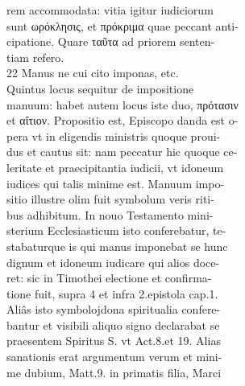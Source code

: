 \documentclass{article}
\begin{document}
\begin{pages}
                rem accommodata: vitia igitur iudiciorum \\
                sunt ωρόκλησις, et πρόκριμα quae peccant anti- \\
                cipatione. Quare ταῦτα ad priorem senten- \\
                tiam refero. \\
                22 Manus ne cui cito imponas, etc. \\
                Quintus locus sequitur de impositione \\
                manuum: habet autem locus iste duo, πρότασιν \\
                et αἴτιον. Propositio est, Episcopo danda est o- \\
                pera vt in eligendis ministris quoque proui- \\
                dus et cautus sit: nam peccatur hic quoque ce- \\
                leritate et praecipitantia iudicii, vt idoneum \\
                iudices qui talis minime est. Manuum impo- \\
                sitio illustre olim fuit symbolum veris riti- \\
                bus adhibitum. In nouo Testamento mini- \\
                sterium Ecclesiasticum isto conferebatur, te- \\
                stabaturque is qui manus imponebat se hunc \\
                dignum et idoneum iudicare qui alios doce- \\
                ret: sic in Timothei electione et confirma- \\
                tione fuit, supra 4 et infra 2.epistola cap.1. \\
                Aliâs isto symbolojdona spiritualia confere- \\
                bantur et visibili aliquo signo declarabat se \\
                praesentem Spiritus S. vt Act.8.et 19. Alias \\
                sanationis erat argumentum verum et mini- \\
                me dubium, Matt.9. in primatis filia, Marci \\

\end{pages}
\end{document}
